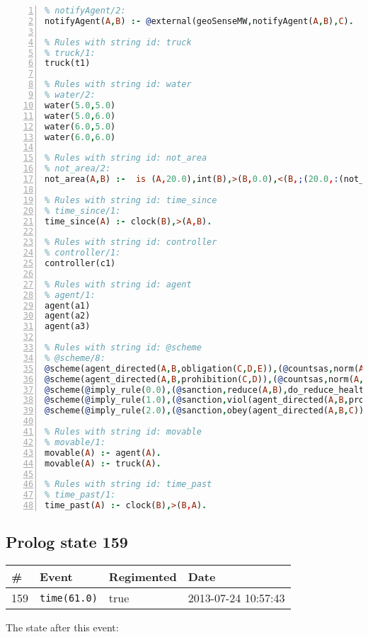 \documentclass[11pt]{article}\usepackage[utf8]{inputenc}\usepackage{geometry}
\begin{document}
\begin{lstlisting}[language=Prolog, numbers=left]
% Rules with string id: notifyAgent
% notifyAgent/2:
notifyAgent(A,B) :- @external(geoSenseMW,notifyAgent(A,B),C).

% Rules with string id: truck
% truck/1:
truck(t1)

% Rules with string id: water
% water/2:
water(5.0,5.0)
water(5.0,6.0)
water(6.0,5.0)
water(6.0,6.0)

% Rules with string id: not_area
% not_area/2:
not_area(A,B) :-  is (A,20.0),int(B),>(B,0.0),<(B,;(20.0,:(not_area(A,B), is (-(B),20.0)))),int(A),>(A,0.0),<(A,;(20.0,:(area(A,B),-(int(A))))),int(B),>(A,0.0),>(B,0.0),<(A,21.0),<(B,21.0).

% Rules with string id: time_since
% time_since/1:
time_since(A) :- clock(B),>(A,B).

% Rules with string id: controller
% controller/1:
controller(c1)

% Rules with string id: agent
% agent/1:
agent(a1)
agent(a2)
agent(a3)

% Rules with string id: @scheme
% @scheme/8:
@scheme(agent_directed(A,B,obligation(C,D,E)),(@countsas,norm(A,B,F,obligation(C,D,E)),F),false,(listTrue(C)),(time_past(D)),false,[plus(viol(agent_directed(A,B,obligation(C,D,E))))|[]],[plus(obey(agent_directed(A,B,obligation(C,D,E))))|[]])
@scheme(agent_directed(A,B,prohibition(C,D)),(@countsas,norm(A,B,E,prohibition(C,D)),E),(listTrue(C)),false,(false),false,[plus(viol(agent_directed(A,B,prohibition(C,D))))|[]],[plus(obey(agent_directed(A,B,prohibition(C,D))))|[]])
@scheme(@imply_rule(0.0),(@sanction,reduce(A,B),do_reduce_health(A,B),notifyAgent(A,changed(status))),true,false,false,false,[min(reduce(A,B))|[]],[])
@scheme(@imply_rule(1.0),(@sanction,viol(agent_directed(A,B,prohibition(C,D))),do_sanction(D)),true,false,false,false,[min(viol(agent_directed(A,B,prohibition(C,D))))|[]],[])
@scheme(@imply_rule(2.0),(@sanction,obey(agent_directed(A,B,C))),true,false,false,false,[min(obey(agent_directed(A,B,C)))|[]],[])

% Rules with string id: movable
% movable/1:
movable(A) :- agent(A).
movable(A) :- truck(A).

% Rules with string id: time_past
% time_past/1:
time_past(A) :- clock(B),>(B,A).

\end{lstlisting}
\clearpage 
\subsection{Prolog state 159}
\begin{table}[ht]
\centering 
\begin{tabular}{l l l l} 
\textbf{\#} & \textbf{Event} & \textbf{Regimented} & \textbf{Date} \\ [0.5ex] 
\hline
159&\texttt{time(61.0)}&true&2013-07-24 10:57:43\\ [1ex] \hline\end{tabular}
\end{table}
The state after this event:
\end{document}
